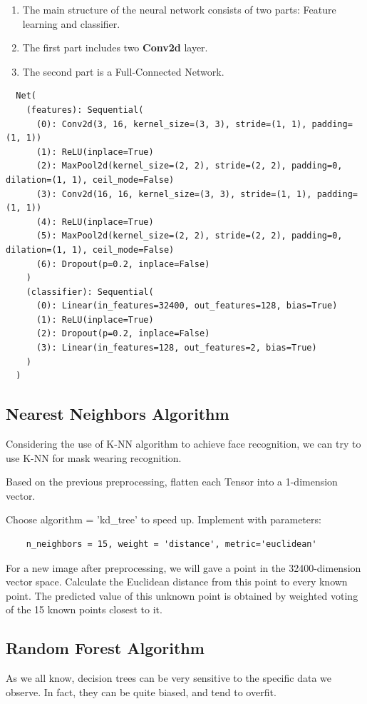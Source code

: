 \documentclass{article}
\begin{document}
  \begin{enumerate}
    \item The main structure of the neural network consists of two parts: Feature learning and classifier.
    \item The first part includes two \textbf{Conv2d} layer.
    \item The second part is a Full-Connected Network.
  \end{enumerate}
  \begin{lstlisting}
  Net(
    (features): Sequential(
      (0): Conv2d(3, 16, kernel_size=(3, 3), stride=(1, 1), padding=(1, 1))
      (1): ReLU(inplace=True)
      (2): MaxPool2d(kernel_size=(2, 2), stride=(2, 2), padding=0, dilation=(1, 1), ceil_mode=False)
      (3): Conv2d(16, 16, kernel_size=(3, 3), stride=(1, 1), padding=(1, 1))
      (4): ReLU(inplace=True)
      (5): MaxPool2d(kernel_size=(2, 2), stride=(2, 2), padding=0, dilation=(1, 1), ceil_mode=False)
      (6): Dropout(p=0.2, inplace=False)
    )
    (classifier): Sequential(
      (0): Linear(in_features=32400, out_features=128, bias=True)
      (1): ReLU(inplace=True)
      (2): Dropout(p=0.2, inplace=False)
      (3): Linear(in_features=128, out_features=2, bias=True)
    )
  )
  \end{lstlisting}

  \subsection{Nearest Neighbors Algorithm}
  Considering the use of K-NN algorithm to achieve face recognition, we can try to use K-NN for mask wearing recognition.

  Based on the previous preprocessing, flatten each Tensor into a 1-dimension vector.

  Choose algorithm = 'kd\_tree' to speed up. Implement with parameters:\begin{lstlisting}
    n_neighbors = 15, weight = 'distance', metric='euclidean'
  \end{lstlisting}
  For a new image after preprocessing, we will gave a point in the 32400-dimension vector space. Calculate the Euclidean distance from this point to every known point. The predicted value of this unknown point is obtained by weighted voting of the 15 known points closest to it.

  \subsection{Random Forest Algorithm}
  As we all know, decision trees can be very sensitive to the specific data we observe. In fact, they can be quite biased, and tend to overfit.
\end{document}
